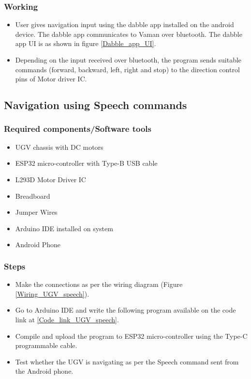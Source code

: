 \subsubsection{Working}
\begin{itemize}
    \item User gives navigation input using the dabble app installed on the android device. The dabble app communicates to Vaman over bluetooth. The dabble app UI is as shown in figure \ref{Dabble_app_UI}.
    \item Depending on the input received over bluetooth, the program sends suitable commands (forward, backward, left, right and stop) to the direction control pins of Motor driver IC.
\end{itemize}


\subsection{Navigation using Speech commands} 
\subsubsection{Required components/Software tools}
\begin{itemize}
    \item  UGV chassis with DC motors
    \item  ESP32 micro-controller with Type-B USB cable
    \item  L293D Motor Driver IC
    \item  Breadboard
    \item  Jumper Wires
    \item  Arduino IDE installed on system
    \item Android Phone
\end{itemize}



\subsubsection{Steps}
\begin{itemize}
    \item Make the connections as per the wiring diagram (Figure \ref{Wiring_UGV_speech}).
    \item Go to Arduino IDE and write the following program available on the code link at \ref{Code_link_UGV_speech}.
    \item Compile and upload the program to ESP32 micro-controller using the Type-C programmable cable. 
    \item Test whether the UGV is navigating as per the Speech command sent from the Android phone.
\end{itemize}

